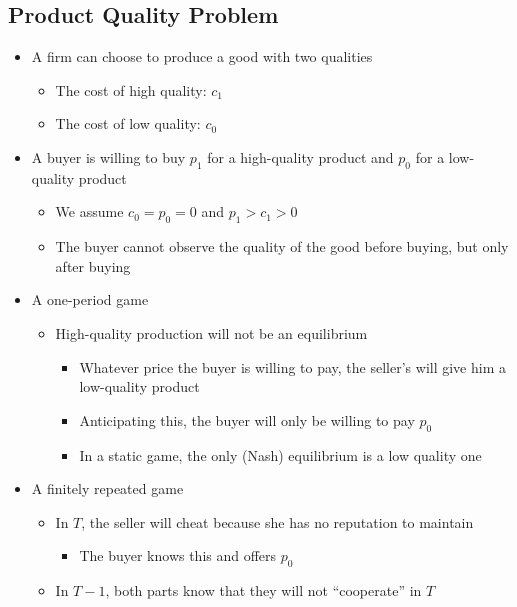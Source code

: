 \documentclass[a4paper]{article}
\begin{document}
\subsection{Product Quality Problem}
\begin{itemize}
    \item A firm can choose to produce a good with two qualities
    \begin{itemize}
        \item The cost of high quality: $c_1$
        \item The cost of low quality: $c_0$
    \end{itemize}
    \item A buyer is willing to buy $p_1$ for a high-quality product and $p_0$ for a low-quality product
    \begin{itemize}
        \item We assume $c_0=p_0=0$ and $p_1>c_1>0$
        \item The buyer cannot observe the quality of the good before buying, but only after buying
    \end{itemize}
    \item A one-period game
    \begin{itemize}
        \item High-quality production will not be an equilibrium
        \begin{itemize}
            \item Whatever price the buyer is willing to pay, the seller’s will give him a low-quality product
            \item Anticipating this, the buyer will only be willing to pay $p_0$
            \item In a static game, the only (Nash) equilibrium is a low quality one
        \end{itemize}
    \end{itemize}
    \item A finitely repeated game
    \begin{itemize}
        \item In $T$, the seller will cheat because she has no reputation to maintain
        \begin{itemize}
            \item The buyer knows this and offers $p_0$
        \end{itemize}
        \item In $T-1$, both parts know that they will not ``cooperate'' in $T$
        \begin{itemize}

\end{itemize}
\end{itemize}
\end{itemize}
\end{document}
